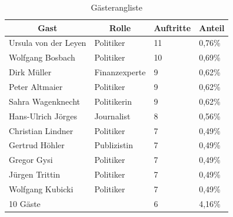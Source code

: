 \begin{table}[ht]
	\centering
	\caption{Gästerangliste}
		\begin{tabular}{@{}llll@{}}
			\toprule
			\multicolumn{1}{c}{\textbf{Gast}} & \multicolumn{1}{c}{\textbf{Rolle}} & \multicolumn{1}{c}{\textbf{Auftritte}} & \multicolumn{1}{c}{\textbf{Anteil}} \\ \midrule
			Ursula von der Leyen              & Politiker                          & 11                                     & 0,76\%                              \\
			Wolfgang Bosbach                  & Politiker                          & 10                                     & 0,69\%                              \\
			Dirk Müller                       & Finanzexperte                      & 9                                      & 0,62\%                              \\ 
			Peter Altmaier                    & Politiker                          & 9                                      & 0,62\%                              \\
			Sahra Wagenknecht                 & Politikerin                        & 9                                      & 0,62\%                              \\
			Hans-Ulrich Jörges                & Journalist                         & 8                                      & 0,56\%                              \\
			Christian Lindner                 & Politiker                          & 7                                      & 0,49\%                              \\
			Gertrud Höhler                    & Publizistin                        & 7                                      & 0,49\%                              \\
			Gregor Gysi                       & Politiker                          & 7                                      & 0,49\%                              \\
			Jürgen Trittin                    & Politiker                          & 7                                      & 0,49\%                              \\
			Wolfgang Kubicki                  & Politiker                          & 7                                      & 0,49\%                              \\
			10 Gäste                          &                                    & 6                                      & 4,16\%                              \\

\end{tabular}
\end{table}
